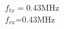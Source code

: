\documentclass[preview]{standalone}
\begin{document}
\begin{center}
$f_{tx}=$0.43MHz\\$f_{rx}$=0.43MHz
\end{center}
\end{document}
